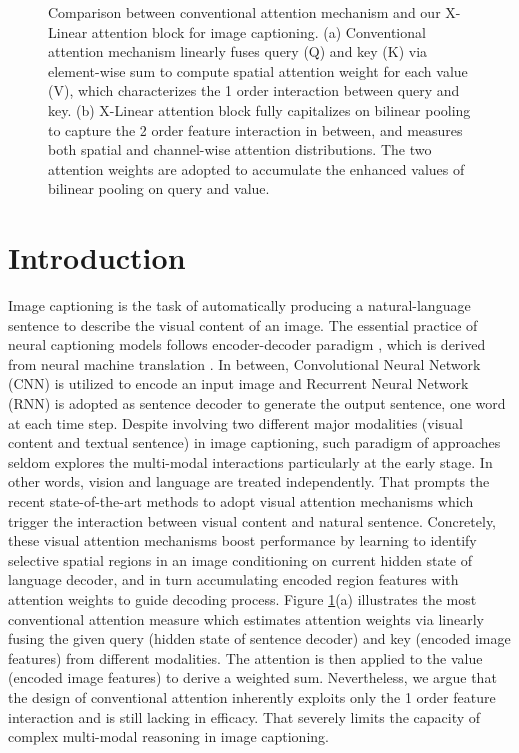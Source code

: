 \documentclass[10pt,twocolumn,letterpaper]{article}
\begin{document}
\begin{figure}[!tb]
\vspace{-0.28in}
\vspace{-0.06in}
\caption{Comparison between conventional attention mechanism and our X-Linear attention block for image captioning. (a) Conventional attention mechanism linearly fuses query (Q) and key (K) via element-wise sum to compute spatial attention weight for each value (V), which characterizes the 1 order interaction between query and key. (b) X-Linear attention block fully capitalizes on bilinear pooling to capture the 2 order feature interaction in between, and measures both spatial and channel-wise attention distributions. The two attention weights are adopted to accumulate the enhanced values of bilinear pooling on query and value.}
\label{fig:fig1}
\vspace{-0.2in}
\end{figure}


\vspace{-0.2in}
\section{Introduction}
Image captioning is the task of automatically producing a natural-language sentence to describe the visual content of an image. The essential practice of neural captioning models follows encoder-decoder paradigm \cite{Mao:NIPS14,Vinyals14}, which is derived from neural machine translation \cite{Sutskever:NIPS14}. In between, Convolutional Neural Network (CNN) is utilized to encode an input image and Recurrent Neural Network (RNN) is adopted as sentence decoder to generate the output sentence, one word at each time step. Despite involving two different major modalities (visual content and textual sentence) in image captioning, such paradigm of approaches seldom explores the multi-modal interactions particularly at the early stage. In other words, vision and language are treated independently. That prompts the recent state-of-the-art methods \cite{anderson2017bottom,Xu:ICML15} to adopt visual attention mechanisms which trigger the interaction between visual content and natural sentence. Concretely, these visual attention mechanisms boost performance by learning to identify selective spatial regions in an image conditioning on current hidden state of language decoder, and in turn accumulating encoded region features with attention weights to guide decoding process. Figure \ref{fig:fig1}(a) illustrates the most conventional attention measure which estimates attention weights via linearly fusing the given query (hidden state of sentence decoder) and key (encoded image features) from different modalities. The attention is then applied to the value (encoded image features) to derive a weighted sum. Nevertheless, we argue that the design of conventional attention inherently exploits only the 1 order feature interaction and is still lacking in efficacy. That severely limits the capacity of complex multi-modal reasoning in image captioning.
\end{document}
